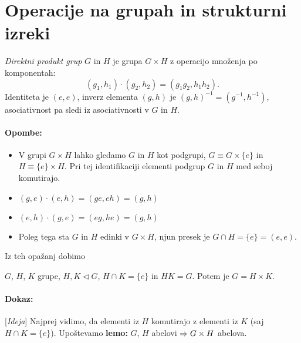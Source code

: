 \section{Operacije na grupah in strukturni izreki}

\begin{defin}
	\emph{Direktni produkt grup} $G$ in $H$ je grupa $G \times H$ z operacijo mno\v zenja po komponentah:
	\[
		(g_1, h_1) \cdot (g_2, h_2) = (g_1 g_2, h_1 h_2).
	\]
	Identiteta je $(e, e)$, inverz elementa $(g, h)$ je $(g, h)^{-1} = (g^{-1}, h^{-1})$, asociativnost pa
	sledi iz asociativnosti v $G$ in $H$.
\end{defin}

\paragraph{Opombe:}
\begin{itemize}
	\item{V grupi $G\times H$ lahko gledamo $G$ in $H$ kot podgrupi, $G \equiv G\times\{e\}$ in $H \equiv \{e\}\times H$. Pri tej
		identifikaciji elementi podgrup $G$ in $H$ med seboj komutirajo.}
	\item{$(g,e) \cdot (e,h) = (ge, eh) = (g,h)$}
	\item{$(e,h) \cdot (g,e) = (eg,he) = (g, h)$}
	\item{Poleg tega sta $G$ in $H$ edinki v $G\times H$, njun presek je $G \cap H = \{e\} = (e,e)$.}
\end{itemize}

\ni Iz teh opa\v zanj dobimo
\begin{trditev}
	$G$, $H$, $K$ grupe, $H,K \lhd G$, $H \cap K = \{e\}$ in $HK = G$. Potem je $G = H \times K$.
\end{trditev}

\paragraph{Dokaz:} [\emph{Ideja}]
Najprej vidimo, da elementi iz $H$ komutirajo z elementi iz $K$ (saj $H \cap K = \{e\}$). Upo\v stevamo {\bf lemo:} $G$, $H$ abelovi $\Rightarrow G\times H$ abelova.

